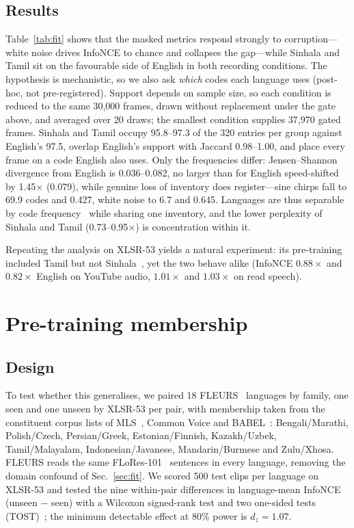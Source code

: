 \documentclass{article}
\begin{document}
\subsection{Results}

Table~\ref{tab:fit} shows that the masked metrics respond strongly to corruption---white noise drives InfoNCE to chance and collapses the gap---while Sinhala and Tamil sit on the favourable side of English in both recording conditions. The hypothesis is mechanistic, so we also ask \emph{which} codes each language uses (post-hoc, not pre-registered). Support depends on sample size, so each condition is reduced to the same 30,000 frames, drawn without replacement under the gate above, and averaged over 20 draws; the smallest condition supplies 37,970 gated frames. Sinhala and Tamil occupy 95.8--97.3 of the 320 entries per group against English's 97.5, overlap English's support with Jaccard 0.98--1.00, and place every frame on a code English also uses. Only the frequencies differ: Jensen--Shannon divergence from English is 0.036--0.082, no larger than for English speed-shifted by 1.45$\times$ (0.079), while genuine loss of inventory does register---sine chirps fall to 69.9 codes and 0.427, white noise to 6.7 and 0.645. Languages are thus separable by code frequency~\cite{linke2023encode} while sharing one inventory, and the lower perplexity of Sinhala and Tamil (0.73--0.95$\times$) is concentration within it.

Repeating the analysis on XLSR-53 yields a natural experiment: its pre-training included Tamil but not Sinhala~\cite{conneau2021xlsr}, yet the two behave alike (InfoNCE $0.88\times$ and $0.82\times$ English on YouTube audio, $1.01\times$ and $1.03\times$ on read speech).

\section{Pre-training membership}
\label{sec:membership}

\subsection{Design}

To test whether this generalises, we paired 18 FLEURS~\cite{conneau2023fleurs} languages by family, one seen and one unseen by XLSR-53 per pair, with membership taken from the constituent corpus lists of MLS~\cite{pratap2020mls}, Common Voice and BABEL~\cite{conneau2021xlsr}: Bengali/Marathi, Polish/Czech, Persian/Greek, Estonian/Finnish, Kazakh/Uzbek, Tamil/Malayalam, Indonesian/Javanese, Mandarin/Burmese and Zulu/Xhosa. FLEURS reads the same FLoRes-101~\cite{goyal2022flores} sentences in every language, removing the domain confound of Sec.~\ref{sec:fit}. We scored 500 test clips per language on XLSR-53 and tested the nine within-pair differences in language-mean InfoNCE (unseen $-$ seen) with a Wilcoxon signed-rank test and two one-sided tests (TOST)~\cite{schuirmann1987tost,lakens2017equivalence}; the minimum detectable effect at 80\% power is $d_z{=}1.07$.
\end{document}
